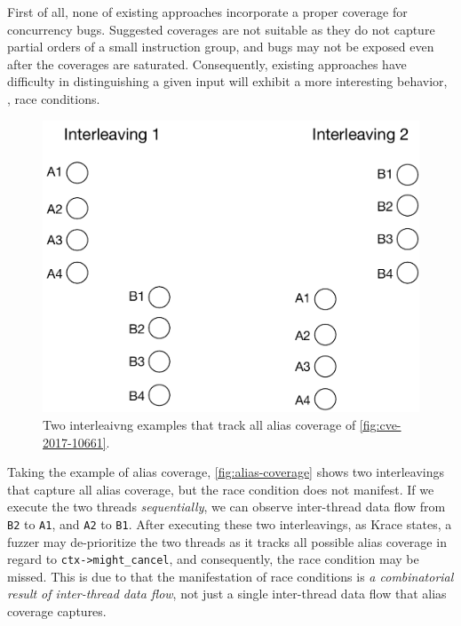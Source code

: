 %
First of all, none of existing approaches incorporate a proper
coverage for concurrency bugs.
%
Suggested coverages are not suitable as
they do not capture partial orders of a small instruction group, and
bugs may not be exposed even after the coverages are saturated.
Consequently, existing approaches have difficulty in distinguishing a
given input will exhibit a more interesting behavior, \ie, race
conditions.

\begin{figure}
  \centering
  \includegraphics[width=0.9\linewidth]{fig/alias-coverage.pdf}
  \caption{Two interleaivng examples that track all alias coverage of
    \autoref{fig:cve-2017-10661}.}
  \label{fig:alias-coverage}
\end{figure}

%
%
Taking the example of alias coverage, \autoref{fig:alias-coverage}
shows two interleavings that capture all alias coverage, but the race
condition does not manifest.
%
If we execute the two threads \textit{sequentially}, we can observe
inter-thread data flow from \texttt{B2} to \texttt{A1}, and
\texttt{A2} to \texttt{B1}.
%
After executing these two interleavings, as Krace states, a fuzzer may
de-prioritize the two threads as it tracks all possible alias coverage
in regard to \texttt{ctx->might_cancel}, and consequently, the race
condition may be missed.
%
This is due to that the manifestation of race conditions is \textit{a
  combinatorial result of inter-thread data flow}, not just a single
inter-thread data flow that alias coverage captures.



